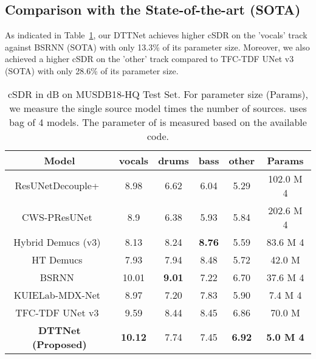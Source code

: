 \subsection{Comparison with the State-of-the-art (SOTA)}
As indicated in Table~\ref{results}, our DTTNet achieves higher cSDR on the 'vocals' track against BSRNN (SOTA) with only 13.3\% of its parameter size. Moreover, we also achieved a higher cSDR on the 'other' track compared to TFC-TDF UNet v3 (SOTA) with only 28.6\% of its parameter size.
\begin{table}[h]
    \centering
    \caption{cSDR in dB on MUSDB18-HQ Test Set. For parameter size (Params), we measure the single source model times the number of sources.  uses bag of 4 models. The parameter of  is measured based on the available code.\protect\footnotemark}\label{results}
    \begin{adjustbox}{width=0.48\textwidth}
    \begin{tabular}{c cccc c}\hline
        Model &vocals &drums & bass & other  & Params
        \\\hline

ResUNetDecouple+~\cite{kong_decoupling_2021}& 
        8.98 & 6.62 & 6.04 & 5.29  & 102.0 M  4\\
        
        CWS-PResUNet~\cite{liu_cws-presunet_2021} & 
        8.9 &  6.38  & 5.93 & 5.84  & 202.6 M  4\\
        
        Hybrid Demucs (v3)~\cite{defossez_hybrid_2021} & 
        8.13 &  8.24 &  \textbf{8.76} &5.59  & 83.6 M  4\\
        
        HT Demucs~\cite{rouard_hybrid_2022} & 
        7.93 &  7.94 &  8.48 & 5.72  &  42.0 M\\
        
        BSRNN~\cite{luo_music_2022} & 
        10.01 &  \textbf{9.01} &  7.22& 6.70& 37.6 M  4\\
        
        KUIELab-MDX-Net~\cite{kimKUIELabMDXNetTwoStreamNeural2021} &8.97  &7.20  &7.83 &5.90  & 7.4 M  4\\
        
        TFC-TDF UNet v3~\cite{kim_sound_2023} & 
        9.59 &  8.44 &  8.45 & 6.86 & 70.0 M\\\hline
        
        
        \textbf{DTTNet (Proposed)} & \textbf{10.12} & 7.74 & 7.45 & \textbf{6.92} & \textbf{5.0 M  4} \\ 
\hline 
    \end{tabular}
    
    \end{adjustbox}
	
\end{table}

